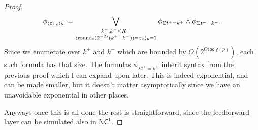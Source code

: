 \begin{proof}
\[
\phi_{\langle\mathbf{c}_{i,c}\rangle_{{b}}}  :=  \bigvee_{\substack{k^+,k^-\leq K\colon\\ \langle\textnormal{round}_{\mathbb{F}}(2^{-2{s}}(k^+-k^-))=z_\kappa\rangle_{{b}}=1}}
\phi_{\Sigma t^+=k^+}\land\phi_{\Sigma t^-=k^-}.
\]
Since we enumerate over $k^+$ and $k^-$ which are bounded by $O(2^{O(\mathsf{poly}(p)})$, each such formula has that size.  
The formulas $\phi_{\Sigma t^+=k^+}$ inherit syntax from the previous proof which I can expand upon later. 
This is indeed exponential, and can be made smaller, but it doesn't matter asymptotically since we have an unavoidable exponential in other places.


Anyways once this is all done the rest is straightforward, since the feedforward layer can be simulated also in $\mathsf{NC}^1$.
\end{proof}